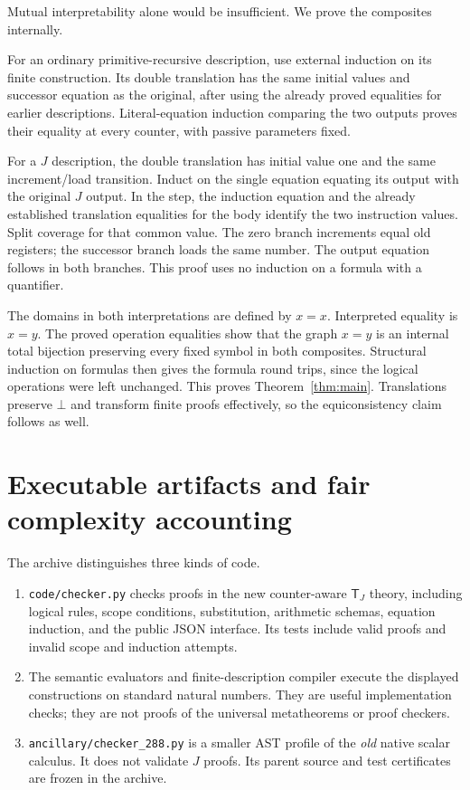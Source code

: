 \documentclass[11pt,letterpaper]{article}
\theoremstyle{definition}\newtheorem{definition}[theorem]{Definition}
\theoremstyle{remark}\newtheorem{remark}[theorem]{Remark}
\newcommand{\TJ}{\mathsf T_J}
\newcommand{\file}[1]{{\small\nolinkurl{#1}}}
\begin{document}
Mutual interpretability alone would be insufficient. We prove the
composites internally.

For an ordinary primitive-recursive description, use external
induction on its finite construction. Its double translation has the
same initial values and successor equation as the original, after
using the already proved equalities for earlier descriptions.
Literal-equation induction comparing the two outputs proves their
equality at every counter, with passive parameters fixed.

For a $J$ description, the double translation has initial value one
and the same increment/load transition. Induct on the single equation
equating its output with the original $J$ output. In the step,
the induction equation and the already established translation
equalities for the body identify the two instruction values.
Split coverage for that common value. The zero branch increments
equal old registers; the successor branch loads the same number.
The output equation follows in both branches. This proof uses no
induction on a formula with a quantifier.

The domains in both interpretations are defined by $x=x$.
Interpreted equality is $x=y$. The proved operation equalities show
that the graph $x=y$ is an internal total bijection preserving every
fixed symbol in both composites. Structural induction on formulas
then gives the formula round trips, since the logical operations
were left unchanged. This proves Theorem~\ref{thm:main}.
Translations preserve $\bot$ and transform finite proofs effectively,
so the equiconsistency claim follows as well.

\section{Executable artifacts and fair complexity accounting}\label{sec:artifacts}

The archive distinguishes three kinds of code.
\begin{enumerate}
\item \file{code/checker.py} checks proofs in the new
counter-aware $\TJ$ theory, including logical rules, scope conditions,
substitution, arithmetic schemas, equation induction, and the public
JSON interface. Its tests include valid proofs and invalid scope and
induction attempts.
\item The semantic evaluators and finite-description compiler execute
the displayed constructions on standard natural numbers. They are
useful implementation checks; they are not proofs of the universal
metatheorems or proof checkers.
\item \file{ancillary/checker_288.py} is a smaller AST profile of the
\emph{old} native scalar calculus. It does not validate $J$ proofs.
Its parent source and test certificates are frozen in the archive.
\end{enumerate}
\end{document}
